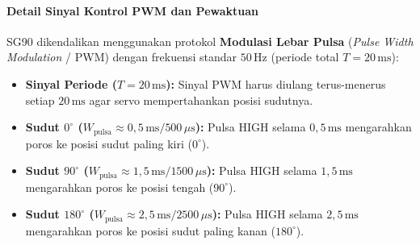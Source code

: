 \paragraph{Detail Sinyal Kontrol PWM dan Pewaktuan}
SG90 dikendalikan menggunakan protokol \textbf{Modulasi Lebar Pulsa} (\textit{Pulse Width Modulation} / PWM) dengan frekuensi standar $50\,\text{Hz}$ (periode total $T = 20\,\text{ms}$):
\begin{itemize}
	\item \textbf{Sinyal Periode ($T = 20\,\text{ms}$):} Sinyal PWM harus diulang terus-menerus setiap $20\,\text{ms}$ agar servo mempertahankan posisi sudutnya.
	\item \textbf{Sudut $0^\circ$ ($W_{\text{pulsa}} \approx 0{,}5\,\text{ms} / 500\,\mu\text{s}$):} Pulsa HIGH selama $0{,}5\,\text{ms}$ mengarahkan poros ke posisi sudut paling kiri ($0^\circ$).
	\item \textbf{Sudut $90^\circ$ ($W_{\text{pulsa}} \approx 1{,}5\,\text{ms} / 1500\,\mu\text{s}$):} Pulsa HIGH selama $1{,}5\,\text{ms}$ mengarahkan poros ke posisi tengah ($90^\circ$).
	\item \textbf{Sudut $180^\circ$ ($W_{\text{pulsa}} \approx 2{,}5\,\text{ms} / 2500\,\mu\text{s}$):} Pulsa HIGH selama $2{,}5\,\text{ms}$ mengarahkan poros ke posisi sudut paling kanan ($180^\circ$).
\end{itemize}

